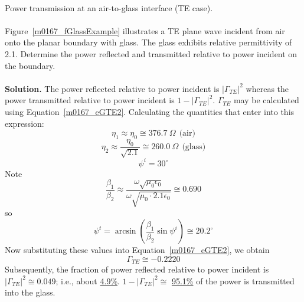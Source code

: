 ~\\ \begin{example} 
\label{m0167_exTERC}
\begin{mdframed}[backgroundcolor=brown!20,linecolor=brown!20]\raggedright
Power transmission at an air-to-glass interface (TE case).
\\~\\
Figure~\ref{m0167_fGlassExample} illustrates a TE plane wave incident from air onto the planar boundary with glass.
The glass exhibits relative permittivity of 2.1.  
Determine the power reflected and transmitted relative to power incident on the boundary.\\
~\\

\noindent
{\bf Solution.}
The power reflected relative to power incident is $\left|\Gamma_{TE}\right|^2$ whereas
the power transmitted relative to power incident is $1-\left|\Gamma_{TE}\right|^2$.
$\Gamma_{TE}$ may be calculated using Equation~\ref{m0167_eGTE2}.
Calculating the quantities that enter into this expression:
%
\begin{equation} 
\eta_1 \approx \eta_0 \cong 376.7~\Omega ~~ \mbox{(air)} 
\end{equation}
%
%
\begin{equation} 
\eta_2 \approx \frac{\eta_0}{\sqrt{2.1}} \cong 260.0~\Omega ~~ \mbox{(glass)} 
\end{equation}
%
\begin{equation}
\psi^i = 30^{\circ} 
\end{equation}
Note
\begin{equation}
\frac{\beta_1}{\beta_2} \approx \frac{\omega\sqrt{\mu_0\epsilon_0}}{\omega\sqrt{\mu_0\cdot2.1\epsilon_0}} \cong 0.690 
\end{equation}
%
so
\begin{equation}
\psi^t = \arcsin\left(\frac{\beta_1}{\beta_2}\sin\psi^i\right) \cong 20.2^{\circ} 
\end{equation}
%
Now substituting these values into Equation~\ref{m0167_eGTE2}, we obtain
%
\begin{equation}
\Gamma_{TE} \cong -0.2220 
\end{equation}
%
Subsequently, the fraction of power reflected relative to power incident is $\left|\Gamma_{TE}\right|^2\cong 0.049$; i.e., about \underline{4.9\%}.
$1-\left|\Gamma_{TE}\right|^2\cong$ \underline{95.1\%} of the power is transmitted into the glass.
\end{mdframed}

\end{example}
